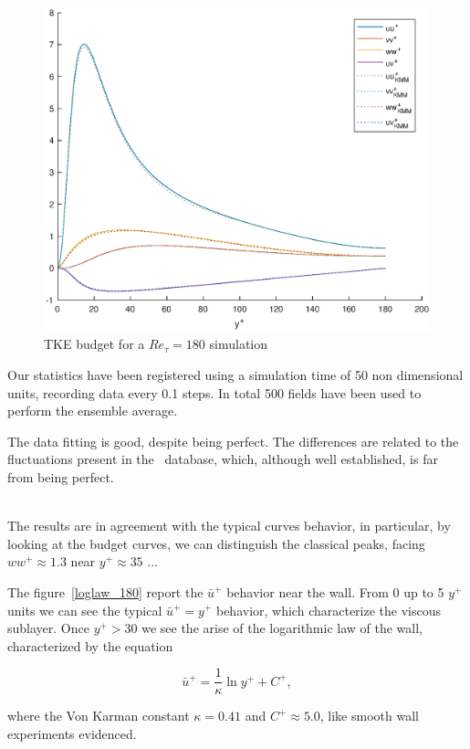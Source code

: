 \begin{figure}
\begin{center}
\includegraphics[scale=0.55]{grafici/budget_180.eps}
\caption{TKE budget for a $Re_{\tau}=180$ simulation}
\label{budget_180}
\end{center} 
\end{figure}


Our statistics have been registered using a simulation time of 50 non dimensional units, recording data every 0.1 steps.
In total 500 fields have been used to perform the ensemble average. \par

The data fitting is good, despite being perfect. The differences are related to the fluctuations present in the~\cite{kim_moin_moser} database, which, although well established, is far from being perfect. \\~\par

The results are in agreement with the typical curves behavior, in particular, by looking at the budget curves, we can distinguish the classical peaks, facing $ww^{+} \approx 1.3$ near $y^{+} \approx 35$  ... \par
The figure~\ref{loglaw_180} report the $\bar{u}^{+}$ behavior near the wall. From 0 up to 5 $y^{+}$ units we can see the typical $\bar{u}^{+}=y^{+}$ behavior, which characterize the viscous sublayer. Once $y^{+}>30$ we see the arise of the logarithmic law of the wall, characterized by the equation

\begin{equation*}
\bar{u}^{+} = \frac{1}{\kappa} \ln y^{+} +C^{+},
\end{equation*}

where the Von Karman constant $\kappa=0.41$ and $C^{+}\approx 5.0$, like smooth wall experiments evidenced.